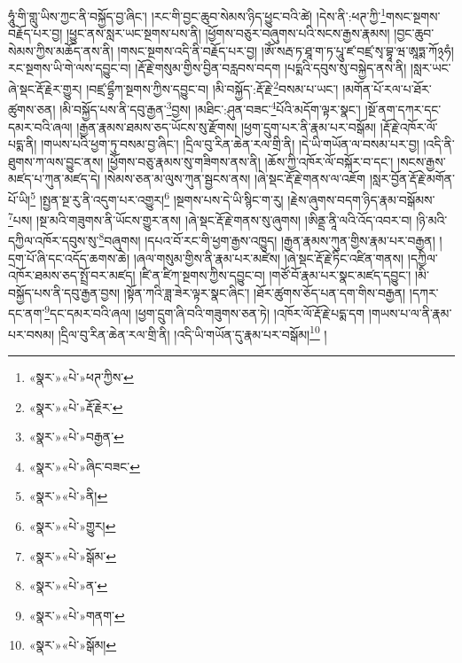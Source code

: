 ཧཱུཾ་གི་གླུ་ཡིས་ཀྱང་ནི་བསྐྱོད་བྱ་ཞིང་། །རང་གི་བྱང་ཆུབ་སེམས་ཉིད་ཕྱུང་བའི་ཚེ། །དེས་ནི་:ཕཊ་ཀྱི་\footnote{«སྣར་»«པེ་»ཕཊ་ཀྱིས་}གསང་སྔགས་བརྗོད་པར་བྱ། །ཕྱུང་ནས་སླར་ཡང་སྔགས་པས་ནི། །ཕྱོགས་བཅུར་བཞུགས་པའི་སངས་རྒྱས་རྣམས། །བྱང་ཆུབ་སེམས་ཀྱིས་མཆོད་ནས་ནི། །གསང་སྔགས་འདི་ནི་བརྗོད་པར་བྱ། །ཨོཾ་སརྦ་ཏ་ཐཱ་ག་ཏ་པཱུ་ཛ་བཛྲ་སྭ་བྷཱ་ཝ་ཨཱཏྨ་ཀོ྅ཧཾ། རང་སྔགས་ཡི་གེ་ལས་དབྱུང་བ། །རྡོ་རྗེ་གསུམ་གྱིས་བྱིན་བརླབས་བདག །པདྨའི་དབུས་སུ་བསྐྱེད་ནས་ནི། །སླར་ཡང་ཞེ་སྡང་རྡོ་རྗེར་གྱུར། །བཛྲ་དྷྲྀཀ་སྔགས་ཀྱིས་དབྱུང་བ། །མི་བསྐྱོད་:རྡོ་རྗེ་\footnote{«སྣར་»«པེ་»རྡོ་རྗེར་}བསམ་པ་ཡང་། །མགོན་པོ་རལ་པ་ཐོར་ཚུགས་ཅན། །མི་བསྐྱོད་པས་ནི་དབུ་རྒྱན་\footnote{«སྣར་»«པེ་»བརྒྱན་}བྱས། །མཐིང་:ཤུན་བཟང་\footnote{«སྣར་»«པེ་»ཞིང་བཟང་}པོའི་མདོག་ལྟར་སྣང་། །སྔོ་ནག་དཀར་དང་དམར་བའི་ཞལ། །རྒྱན་རྣམས་ཐམས་ཅད་ཡོངས་སུ་རྫོགས། །ཕྱག་དྲུག་པར་ནི་རྣམ་པར་བསྒོམ། །རྡོ་རྗེ་འཁོར་ལོ་པདྨ་ནི། །གཡས་པའི་ཕྱག་ཏུ་བསམ་བྱ་ཞིང་། །དྲིལ་བུ་རིན་ཆེན་རལ་གྲི་ནི། །དེ་ཡི་གཡོན་ལ་བསམ་པར་བྱ། །འདི་ནི་ཐུགས་ཀ་ལས་བྱུང་ནས། །ཕྱོགས་བཅུ་རྣམས་སུ་གཟིགས་ནས་ནི། །ཆོས་ཀྱི་འཁོར་ལོ་བསྐོར་བ་དང་། །སངས་རྒྱས་མཛད་པ་ཀུན་མཛད་དེ། །སེམས་ཅན་མ་ལུས་ཀུན་སྦྱངས་ནས། །ཞེ་སྡང་རྡོ་རྗེ་གནས་ལ་འཇོག །སླར་བྱོན་རྡོ་རྗེ་མགོན་པོ་ཡི།\footnote{«སྣར་»«པེ་»ནི།} །སྤྱན་སྔ་རུ་ནི་འདུག་པར་འགྱུར།\footnote{«སྣར་»«པེ་»གྱུར།} །སྔགས་པས་དེ་ཡི་སྙིང་ག་རུ། །རྗེས་ཞུགས་བདག་ཉིད་རྣམ་བསྒོམས་\footnote{«སྣར་»«པེ་»སྒོམ་}པས། །སྔ་མའི་གཟུགས་ནི་ཡོངས་གྱུར་ནས། །ཞེ་སྡང་རྡོ་རྗེ་གནས་སུ་ཞུགས། །ཨིནྡྲ་ནཱི་ལའི་འོད་འབར་བ། །ཉི་མའི་དཀྱིལ་འཁོར་དབུས་སུ་\footnote{«སྣར་»«པེ་»ན་}བཞུགས། །དཔའ་བོ་རང་གི་ཕྱག་རྒྱས་འཁྱུད། །རྒྱན་རྣམས་ཀུན་གྱིས་རྣམ་པར་བརྒྱན། །དྲག་པོ་ཞི་དང་འདོད་ཆགས་ཆེ། །ཞལ་གསུམ་གྱིས་ནི་རྣམ་པར་མཛེས། །ཞེ་སྡང་རྡོ་རྗེ་ཏིང་འཛིན་གནས། །དཀྱིལ་འཁོར་ཐམས་ཅད་སྤྲོ་བར་མཛད། །ཛི་ན་ཛིཀ་སྔགས་ཀྱིས་དབྱུང་བ། །གཙོ་བོ་རྣམ་པར་སྣང་མཛད་དབྱུང་། །མི་བསྐྱོད་པས་ནི་དབུ་རྒྱན་བྱས། །སྟོན་ཀའི་ཟླ་ཟེར་ལྟར་སྣང་ཞིང་། །ཐོར་ཚུགས་ཅོད་པན་དག་གིས་བརྒྱན། །དཀར་དང་ནག་\footnote{«སྣར་»«པེ་»གནག་}དང་དམར་བའི་ཞལ། །ཕྱག་དྲུག་ཞི་བའི་གཟུགས་ཅན་ཏེ། །འཁོར་ལོ་རྡོ་རྗེ་པདྨ་དག །གཡས་པ་ལ་ནི་རྣམ་པར་བསམ། །དྲིལ་བུ་རིན་ཆེན་རལ་གྲི་ནི། །འདི་ཡི་གཡོན་དུ་རྣམ་པར་བསྒོམ།\footnote{«སྣར་»«པེ་»སྒོམ།} །
